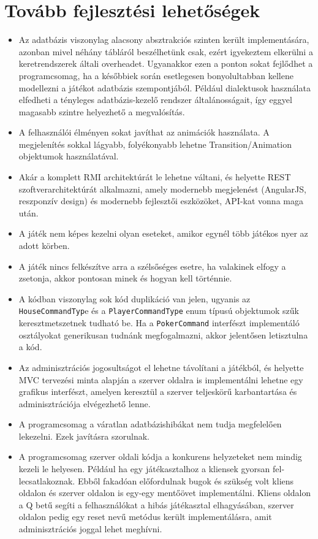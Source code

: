 \section{Tovább fejlesztési lehetőségek}
\begin{itemize}
\item Az adatbázis viszonylag alacsony absztrakciós szinten került implementására, azonban mivel néhány tábláról beszélhetünk csak, ezért igyekeztem elkerülni a keretrendszerek általi overheadet. Ugyanakkor ezen a ponton sokat fejlődhet a programcsomag, ha a későbbiek során esetlegesen bonyolultabban kellene modellezni a játékot adatbázis szempontjából. Például dialektusok használata elfedheti a tényleges adatbázis-kezelő rendszer általánosságait, így eggyel magasabb szintre helyezhető a megvalósítás.
\item A felhasználói élményen sokat javíthat az animációk használata. A megjelenítés sokkal lágyabb, folyékonyabb lehetne Transition/Animation\cite{animations} objektumok használatával.
\item Akár a komplett RMI architektúrát le lehetne váltani, és helyette REST szoftverarchitektúrát alkalmazni, amely modernebb megjelenést (AngularJS, reszponzív design) és modernebb fejlesztői eszközöket, API-kat vonna maga után.
\item A játék nem képes kezelni olyan eseteket, amikor egynél több játékos nyer az adott körben.
\item A játék nincs felkészítve arra a szélsőséges esetre, ha valakinek elfogy a zsetonja, akkor pontosan minek és hogyan kell történnie.
\item A kódban viszonylag sok kód duplikáció van jelen, ugyanis az \texttt{HouseCommandTyp}e és a \texttt{PlayerCommandType} enum típusú objektumok szűk keresztmetszetnek tudható be. Ha a \texttt{PokerCommand} interfészt implementáló osztályokat generikusan tudnánk megfogalmazni, akkor jelentősen letisztulna a kód.
\item Az adminisztrációs jogosultságot el lehetne távolítani a játékból, és helyette MVC tervezési minta alapján a szerver oldalra is implementálni lehetne egy grafikus interfészt, amelyen keresztül a szerver teljeskörű karbantartása és adminisztrációja elvégezhető lenne.
\item A programcsomag a váratlan adatbázishibákat nem tudja megfelelően lekezelni. Ezek javításra szorulnak.
\item A programcsomag szerver oldali kódja a konkurens helyzeteket nem mindig kezeli le helyesen. Például ha egy játékasztalhoz a kliensek gyorsan fel-lecsatlakoznak. Ebből fakadóan előfordulnak bugok és szükség volt kliens oldalon és szerver oldalon is egy-egy mentőövet implementálni. Kliens oldalon a Q betű segíti a felhasználókat a hibás játékasztal elhagyásában, szerver oldalon pedig egy reset nevű metódus került implementálásra, amit adminisztrációs joggal lehet meghívni.
\end{itemize}


\clearpage

